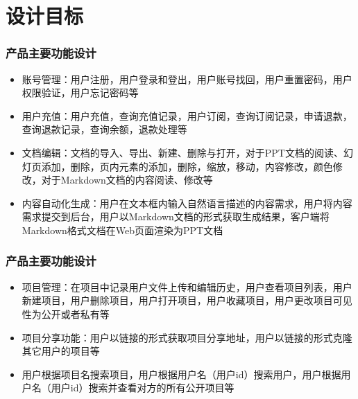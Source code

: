 \section{设计目标}
\begin{frame}
    \frametitle{产品主要功能设计}
    \begin{itemize}
        \item 账号管理：用户注册，用户登录和登出，用户账号找回，用户重置密码，用户权限验证，用户忘记密码等
        \item 用户充值：用户充值，查询充值记录，用户订阅，查询订阅记录，申请退款，查询退款记录，查询余额，退款处理等
        \item 文档编辑：文档的导入、导出、新建、删除与打开，对于PPT文档的阅读、幻灯页添加，删除，页内元素的添加，删除，缩放，移动，内容修改，颜色修改，对于Markdown文档的内容阅读、修改等
        \item 内容自动化生成：用户在文本框内输入自然语言描述的内容需求，用户将内容需求提交到后台，用户以Markdown文档的形式获取生成结果，客户端将Markdown格式文档在Web页面渲染为PPT文档
    \end{itemize}
\end{frame}

\begin{frame}
    \frametitle{产品主要功能设计}
    \begin{itemize}
        \item 项目管理：在项目中记录用户文件上传和编辑历史，用户查看项目列表，用户新建项目，用户删除项目，用户打开项目，用户收藏项目，用户更改项目可见性为公开或者私有等
        \item 项目分享功能：用户以链接的形式获取项目分享地址，用户以链接的形式克隆其它用户的项目等
        \item 用户根据项目名搜索项目，用户根据用户名（用户id）搜索用户，用户根据用户名（用户id）搜索并查看对方的所有公开项目等
    \end{itemize}
\end{frame}